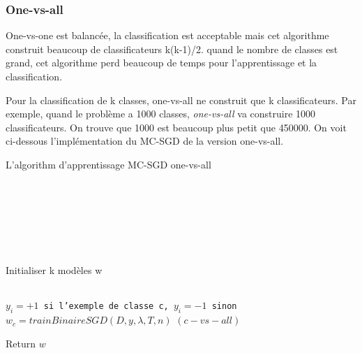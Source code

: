 \subsubsection{One-vs-all}
One-vs-one est balancée, la classification est acceptable mais cet algorithme construit beaucoup de classificateurs k(k-1)/2. quand le nombre de classes est grand, cet algorithme perd beaucoup de temps pour l'apprentissage et la classification.

Pour la classification de k classes, one-vs-all ne construit que k classificateurs. Par exemple, quand le problème a 1000 classes, \textit{one-vs-all} va construire 1000 classificateurs. On trouve que 1000 est beaucoup plus petit que 450000. On voit ci-dessous l'implémentation du MC-SGD de la version one-vs-all.

\makeatletter
\def\BState{\State\hskip-\ALG@thistlm}
\makeatother

\begin{algorithm}[H]
\caption{L'algorithm d'apprentissage MC-SGD one-vs-all}\label{mcsgdal}
\begin{algorithmic}[1]

\\
\\
\\
\\
\\
\\

\State Initialiser k modèles w

\\
\State \texttt{$y_i = +1$ si l'exemple de classe c, $y_i = -1$ sinon}
\State \texttt{$w_c = trainBinaireSGD(D, y, \lambda, T, n)$} $(c-vs-all)$
\EndFor

\State Return $w$

\EndProcedure
\end{algorithmic}
\end{algorithm}

